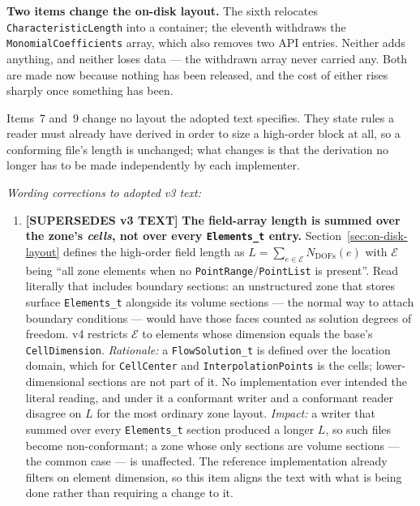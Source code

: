 \documentclass[11pt,letterpaper]{article}
\newif\ifvfourdraft
\newenvironment{v4block}{\ifvfourdraft\color{v4violet}\fi\ignorespaces}{\par}
\newcommand{\SUPERSEDESIV}{\ifvfourdraft
  \textcolor{v4violet}{\textbf{[SUPERSEDES v3 TEXT]}}\else
  \textcolor{clarifybrown}{\textbf{[SUPERSEDES v3 TEXT]}}\fi}
\begin{document}
{\begin{v4block}
\noindent \textbf{Two items change the on-disk layout.}  The sixth relocates
\texttt{CharacteristicLength} into a container; the eleventh withdraws the
\texttt{MonomialCoefficients} array, which also removes two API entries.  Neither
adds anything, and neither loses data --- the withdrawn array never carried any.
Both are made now because nothing has been released, and the cost of either rises
sharply once something has been.

\noindent Items~7 and~9 change no layout the adopted text specifies.  They state
rules a reader must already have derived in order to size a high-order block at
all, so a conforming file's length is unchanged; what changes is that the
derivation no longer has to be made independently by each implementer.

\medskip
\noindent\textit{Wording corrections to adopted v3 text:}

\begin{enumerate}[leftmargin=1.4em,itemsep=0.5em]

  \item \SUPERSEDESIV{} \textbf{The field-array length is summed over the zone's
    \emph{cells}, not over every \texttt{Elements\_t} entry.}
    Section~\ref{sec:on-disk-layout} defines the high-order field length as
    $L=\sum_{e\in\mathcal{E}} N_\mathrm{DOFs}(e)$ with $\mathcal{E}$ being ``all
    zone elements when no \texttt{PointRange}/\texttt{PointList} is present''.
    Read literally that includes boundary sections: an unstructured zone that
    stores surface \texttt{Elements\_t} alongside its volume sections --- the
    normal way to attach boundary conditions --- would have those faces counted
    as solution degrees of freedom.  v4 restricts $\mathcal{E}$ to elements whose
    dimension equals the base's \texttt{CellDimension}.
    \textit{Rationale:} a \texttt{FlowSolution\_t} is defined over the location
    domain, which for \texttt{CellCenter} and \texttt{InterpolationPoints} is the
    cells; lower-dimensional sections are not part of it.  No implementation ever
    intended the literal reading, and under it a conformant writer and a
    conformant reader disagree on $L$ for the most ordinary zone layout.
    \textit{Impact:} a writer that summed over every \texttt{Elements\_t} section
    produced a longer $L$, so such files become non-conformant; a zone whose only
    sections are volume sections --- the common case --- is unaffected.  The
    reference implementation already filters on element dimension, so this item
    aligns the text with what is being done rather than requiring a change to it.


\end{enumerate}
\end{v4block}}
\end{document}
